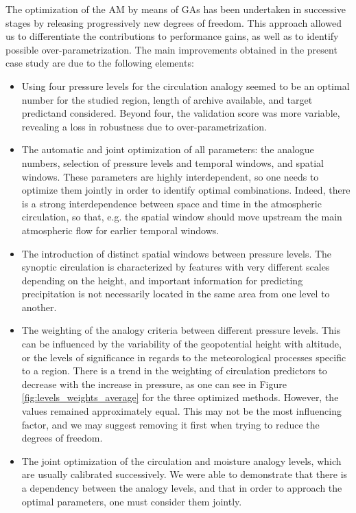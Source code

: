 \documentclass[review]{elsarticle}
\begin{document}
The optimization of the AM by means of GAs has been undertaken in successive stages by releasing progressively new degrees of freedom. This approach allowed us to differentiate the contributions to performance gains, as well as to identify possible over-parametrization. The main improvements obtained in the present case study are due to the following elements:

\begin{itemize}
	\item Using four pressure levels for the circulation analogy seemed to be an optimal number for the studied region, length of archive available, and target predictand considered. Beyond four, the validation score was more variable, revealing a loss in robustness due to over-parametrization.
	\item The automatic and joint optimization of all parameters: the analogue numbers, selection of pressure levels and temporal windows, and spatial windows. These parameters are highly interdependent, so one needs to optimize them jointly in order to identify optimal combinations. Indeed, there is a strong interdependence between space and time in the atmospheric circulation, so that, e.g. the spatial window should move upstream the main atmospheric flow for earlier temporal windows.
	\item The introduction of distinct spatial windows between pressure levels. The synoptic circulation is characterized by features with very different scales depending on the height, and important information for predicting precipitation is not necessarily located in the same area from one level to another.
	\item The weighting of the analogy criteria between different pressure levels. This can be influenced by the variability of the geopotential height with altitude, or the levels of significance in regards to the meteorological processes specific to a region. There is a trend in the weighting of circulation predictors to decrease with the increase in pressure, as one can see in Figure \ref{fig:levels_weights_average} for the three optimized methods. However, the values remained approximately equal. This may not be the most influencing factor, and we may suggest removing it first when trying to reduce the degrees of freedom.
	\item The joint optimization of the circulation and moisture analogy levels, which are usually calibrated successively. We were able to demonstrate that there is a dependency between the analogy levels, and that in order to approach the optimal parameters, one must consider them jointly.
\end{itemize}
\end{document}
